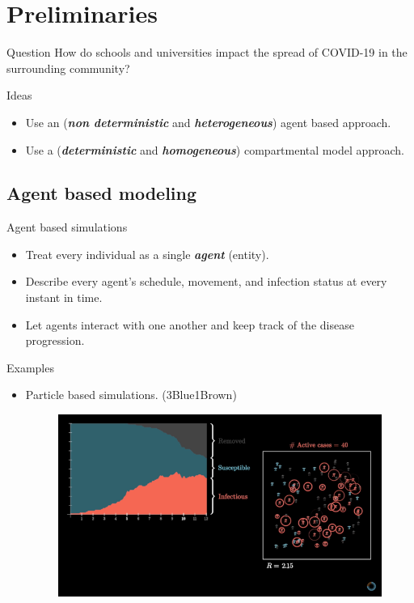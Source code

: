 \documentclass[aspectratio=169]{beamer}
\newcommand\boldgreen[1]{\textcolor{lighter_csu_green}{\emph{\textbf{#1}}}}
\begin{document}
\section{Preliminaries}

\begin{frame}{Question}
\vfill
    \center
    \pause
    How do schools and universities impact the spread of COVID-19 in the surrounding community?
\vfill
\end{frame}


\begin{frame}{Ideas}
    \vfill
    \center
    \pause
    \begin{itemize}
        \item Use an (\boldgreen{non deterministic} and \boldgreen{heterogeneous}) agent based approach.
        \pause
        \item Use a (\boldgreen{deterministic} and \boldgreen{homogeneous}) compartmental model approach.
    \end{itemize} 
   \vfill
\end{frame}

\subsection{Agent based modeling}

\begin{frame}{Agent based simulations}
    \vfill
    \begin{itemize}
    \pause
        \item Treat every individual as a single \boldgreen{agent} (entity).
        \pause
        \item Describe every agent's schedule, movement, and infection status at every instant in time.
        \pause
        \item Let agents interact with one another and keep track of the disease progression.
    \end{itemize}
    \vfill
\end{frame}

\begin{frame}{Examples}
    \vfill
    \begin{itemize}
    \pause
        \item Particle based simulations. (3Blue1Brown)
        \vspace*{1cm}
        \begin{figure}[H]
            \centering
            \includegraphics[width=.5\textwidth]{figures/3b1b_covid_agent.png}
        \end{figure}
    \end{itemize}
    \vfill
\end{frame}
\end{document}

